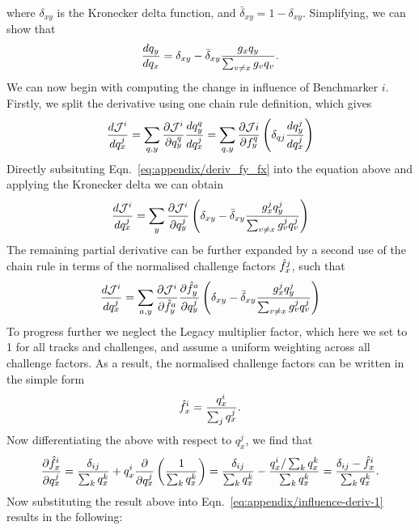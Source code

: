 where $\delta_{xy}$ is the Kronecker delta function, and $\bar{\delta}_{xy} = 1 - \delta_{xy}$. 
Simplifying, we can show that 
\begin{equation}
    \label{eq:appendix/deriv_fy_fx}
    \frac{d q_y}{d q_x} = \delta_{xy} - \bar{\delta}_{xy} \frac{g_x q_y}{\sum_{v \neq x} g_v q_v}.
\end{equation}
We can now begin with computing the change in influence of Benchmarker $i$. Firstly, we split the derivative using one chain rule definition, which gives
\begin{equation}
    \frac{d \mathcal{J}^i}{d q_x^j} = \sum_{q,y} \frac{\partial \mathcal{J}^i}{\partial q_y^q} \frac{d q_y^q}{d q_x^j} = \sum_{q,y} \frac{\partial \mathcal{J}i}{\partial f_y^q}\left(\delta_{qj} \frac{d q_y^j}{d q_x^j}\right)
\end{equation}
Directly subsituting Eqn.~\ref{eq:appendix/deriv_fy_fx} into the equation above and applying the Kronecker delta we can obtain
\begin{equation}
\frac{d \mathcal{J}^i}{d q_x^j} = \sum_y \frac{\partial \mathcal{J}^i}{\partial q_y^j}\left(\delta_{xy} - \bar{\delta}_{xy} \frac{g^j_x q^j_y}{\sum_{v\neq x} g^j_v q^j_v}\right)
\end{equation}
The remaining partial derivative can be further expanded by a second use of the chain rule in terms of the normalised challenge factors $\hat{f}_x^j$, such that 
\begin{equation}
    \frac{d \mathcal{J}^i}{d q_x^j} = \sum_{a,y} \frac{\partial \mathcal{J}^i}{\partial \hat{f}^a_y}\frac{\partial \hat{f}^a_y}{\partial q^j_y} \left(\delta_{xy} - \bar{\delta}_{xy} \frac{g^j_x q^j_y}{\sum_{v\neq x} g^j_v q^j_v}\right)
    \label{eq:appendix/influence-deriv-1}
\end{equation}
To progress further we neglect the Legacy multiplier factor, which here we set to 1 for all tracks and challenges, and assume a uniform weighting across all challenge factors. 
As a result, the normalised challenge factors can be written in the simple form 
\begin{equation}
    \hat{f}^i_x = \frac{q^i_x}{\sum_j q^j_x}.
\end{equation}
Now differentiating the above with respect to $q^j_x$, we find that 
\begin{equation}
    \frac{\partial \hat{f}^i_x}{\partial q^j_x} = \frac{\delta_{ij}}{\sum_k q^k_x} + q^i_x \frac{\partial }{\partial q^j_x}\left(\frac{1}{\sum_k q^k_x}\right) = \frac{\delta_{ij}}{\sum_k q^k_x} - \frac{q^i_x / \sum_k q^k_x}{\sum_k q^k_x} = \frac{\delta_{ij} - \hat{f}^i_x}{\sum_k q^k_x}.
\end{equation}
Now substituting the result above into Eqn.~\ref{eq:appendix/influence-deriv-1} results in the following:
